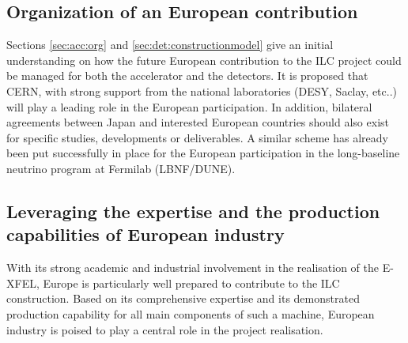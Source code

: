 \documentclass[%
 reprint,
 floatfix,
 amsmath,amssymb,
 aps,
]{revtex4-1}
\begin{document}


\subsection{\label{sec:discussionOrg} Organization of an European contribution}
Sections \ref{sec:acc:org} and \ref{sec:det:constructionmodel} give an initial understanding on how the future European contribution
to the ILC project could be managed for both the accelerator and the detectors. It is proposed that CERN, with strong support from the national laboratories (DESY, Saclay, etc..) will play a leading role in the European participation. In addition, bilateral agreements between Japan and interested European countries should also exist for specific studies, developments or deliverables. A similar scheme has already been put successfully in place for the European participation in the long-baseline neutrino program at Fermilab (LBNF/DUNE).

\subsection{\label{sec:discussionInd}Leveraging the expertise and the production capabilities of European industry}
With its strong academic and industrial involvement in the realisation of the E-XFEL, Europe is particularly well prepared to contribute to the ILC construction. Based on its comprehensive expertise and its demonstrated production capability for all main components of such a machine, European industry is poised to play a central role in the project realisation. 
\end{document}
